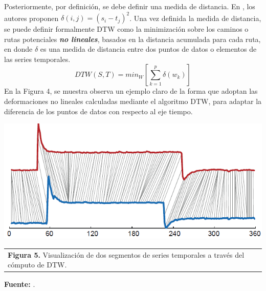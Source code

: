 Posteriormente, por definici\'on, se debe definir una medida de distancia. En \cite{dtw}, los autores proponen $\delta(i,j) = (s_i - t_j)^2$. Una vez definida la medida de distancia, se puede definir formalmente DTW como la minimizaci\'on sobre los caminos o rutas potenciales \textbf{\textit{no lineales}}, basados en la distancia acumulada para cada ruta, en donde $\delta$ es una medida de distancia entre dos puntos de datos o elementos de las series temporales.
\begin{equation}
DTW (S,T) = min_W[\sum\limits_{k=1}^{p}\delta(w_k)]
\end{equation}
En la Figura 4, se muestra observa un ejemplo claro de la forma que adoptan las deformaciones no lineales calculadas mediante el algoritmo DTW, para adaptar la diferencia de los puntos de datos con respecto al eje tiempo.
\begin{center}
\includegraphics[scale=0.7]{dtw2.png}\\
\vspace*{10pt}
\footnotesize{
\begin{tabular}{l}
\textbf{Figura 5.} Visualizaci\'on de dos segmentos de series temporales a trav\'es del c\'omputo de DTW.
\end{tabular}{}
}
\textbf{Fuente:} \cite{dtw}.
\end{center}
